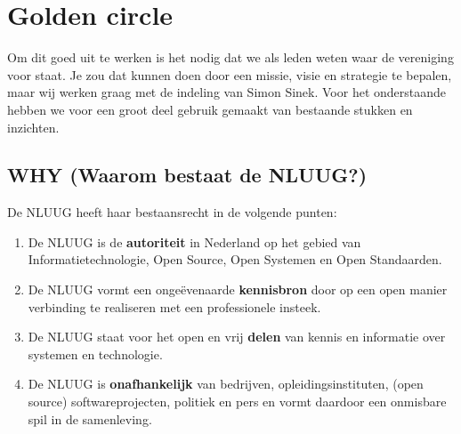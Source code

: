 \documentclass{article}
\begin{document}
\section{Golden circle}
Om dit goed uit te werken is het nodig dat we als leden weten waar de vereniging voor staat. Je zou dat kunnen doen door een missie, visie en strategie te bepalen, maar wij werken graag met de indeling van Simon Sinek. Voor het onderstaande hebben we voor een groot deel gebruik gemaakt van bestaande stukken en inzichten.

\subsection{WHY (Waarom bestaat de NLUUG?)}
De NLUUG heeft haar bestaansrecht in de volgende punten:
\begin{enumerate}
    \item De NLUUG is de \textbf{autoriteit} in Nederland op het gebied van Informatietechnologie, Open Source, Open Systemen en Open Standaarden.
    \item De NLUUG vormt een onge\"evenaarde \textbf{kennisbron} door op een open manier verbinding te realiseren met een professionele insteek.
    \item De NLUUG staat voor het open en vrij \textbf{delen} van kennis en informatie over systemen en technologie.
    \item De NLUUG is \textbf{onafhankelijk} van bedrijven, opleidingsinstituten, (open source) softwareprojecten, politiek en pers en vormt daardoor een onmisbare spil in de samenleving.
\end{enumerate}
\end{document}
